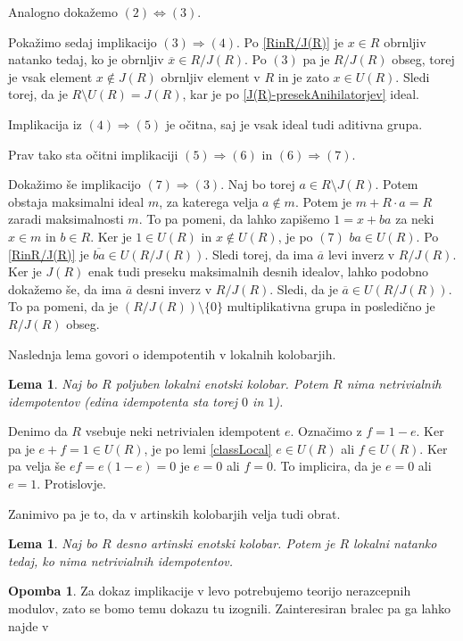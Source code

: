 \documentclass[a4paper, 12pt]{amsart}
\theoremstyle{definition} %
\newtheorem{opomba}[definicija]{Opomba}
\theoremstyle{plain} %
\newtheorem{lema}[definicija]{Lema}
\begin{document}
Analogno dokažemo $(2) \Leftrightarrow (3)$.

Pokažimo sedaj implikacijo $(3) \Rightarrow (4)$. Po \ref{RinR/J(R)} je $x\in R$ obrnljiv natanko tedaj, ko je obrnljiv $\overline{x}\in R/J(R)$. Po $(3)$ pa je $R/J(R)$ obseg, torej je vsak element $x\notin J(R)$ obrnljiv element v $R$ in je zato $x\in U(R)$. Sledi torej, da je $R\setminus U(R) = J(R)$, kar je po \ref{J(R)-presekAnihilatorjev} ideal.

Implikacija iz $(4)\Rightarrow (5)$ je očitna, saj je vsak ideal tudi aditivna grupa.

Prav tako sta očitni implikaciji $(5) \Rightarrow (6) $ in $(6) \Rightarrow (7)$. 

Dokažimo še implikacijo $(7) \Rightarrow (3)$. Naj bo torej $a\in R\setminus J(R)$. Potem obstaja maksimalni ideal $m$, za katerega velja $a\notin m$. Potem je $m+ R\cdot a = R$ zaradi maksimalnosti $m$. To pa pomeni, da lahko zapišemo $1 = x+ba$ za neki $x\in m$ in $b\in R$. Ker je $1\in U(R)$ in $x\notin U(R)$, je po $(7)$ $ba \in U(R)$. Po \ref{RinR/J(R)} je $\overline{ba} \in U(R/J(R))$. Sledi torej, da ima $\overline{a}$ levi inverz v $R/J(R)$. Ker je $J(R)$ enak tudi preseku maksimalnih desnih idealov, lahko podobno dokažemo še, da ima $\overline{a}$ desni inverz v $R/J(R)$. Sledi, da je $\overline{a}\in U(R/J(R))$. To pa pomeni, da je $(R/J(R)) \setminus \{0\}$ multiplikativna grupa in posledično je $R/J(R) $ obseg.
\endproof

Naslednja lema govori o idempotentih v lokalnih kolobarjih.
\begin{lema}
Naj bo $R$ poljuben lokalni enotski kolobar. Potem $R$ nima netrivialnih idempotentov (edina idempotenta sta torej $0$ in $1$).
\end{lema}

\proof
Denimo da $R$ vsebuje neki netrivialen idempotent $e$. Označimo z $f=1-e$. Ker pa je $e+f = 1\in U(R)$, je po lemi \ref{classLocal} $e\in U(R)$ ali $f\in U(R)$. Ker pa velja še $ef = e(1-e) = 0$ je $e=0$ ali $f=0$. To implicira, da je $e=0$ ali $e=1$. Protislovje. 
\endproof

Zanimivo pa je to, da v artinskih kolobarjih velja tudi obrat.

\begin{lema}
\label{localIffNoIdemp}
Naj bo $R$ desno artinski enotski kolobar. Potem je $R$ lokalni natanko tedaj, ko nima netrivialnih idempotentov.
\end{lema}

\begin{opomba}
Za dokaz implikacije v levo potrebujemo teorijo nerazcepnih modulov, zato se bomo temu dokazu tu izognili. Zainteresiran bralec pa ga lahko najde v \cite[Posledica 19.19]{Lam}
\end{opomba}
\end{document}
